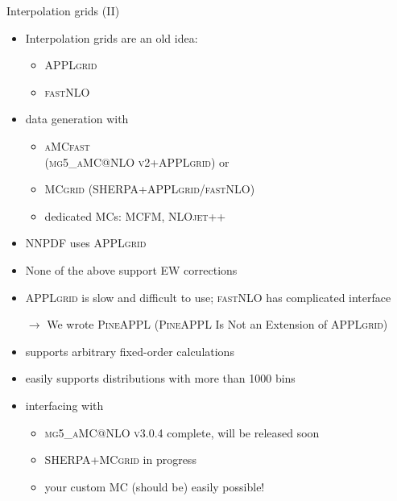 \begin{frame}{Interpolation grids (II)}
\begin{itemize}
\item Interpolation grids are an old idea:
\begin{itemize}
\item \textrm{\textsc{APPLgrid}} 
\item \textrm{\textsc{fastNLO}} 
\end{itemize}
\item data generation with
\begin{itemize}
\item \textrm{\textsc{aMCfast}}  \\
(\textrm{\textsc{mg5\_aMC@NLO v2+APPLgrid}}) or
\item \textrm{\textsc{MCgrid}}  %
(\textrm{\textsc{SHERPA+APPLgrid/fastNLO}})
\item dedicated MCs: \textrm{\textsc{MCFM}}, \textrm{\textsc{NLOjet++}}
\end{itemize}
\item NNPDF uses \textrm{\textsc{APPLgrid}}
\item None of the above support EW corrections
\item \textrm{\textsc{APPLgrid}} is slow and difficult to use; \textrm{\textsc{fastNLO}} has complicated interface
\end{itemize}

\vspace*{\fill}

\begin{itemize}
\item[$\rightarrow$] We wrote \textrm{\textsc{PineAPPL}} (\textrm{\textsc{PineAPPL}} Is Not an Extension of \textrm{\textsc{APPLgrid}})
\item supports arbitrary fixed-order calculations
\item easily supports distributions with more than 1000 bins
\item interfacing with
\begin{itemize}
\item \textrm{\textsc{mg5\_aMC@NLO v3.0.4}} complete, will be released soon
\item \textrm{\textsc{SHERPA+MCgrid}} in progress
\item your custom MC (should be) easily possible!
\end{itemize}
\end{itemize}
\end{frame}

